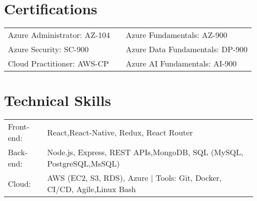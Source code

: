 \documentclass[a4paper,12pt]{article}
\begin{document}


\section{Certifications}

\begin{tabularx}{\linewidth}{@{} l X l @{}}
  
    Azure Administrator: AZ-104 & \quad & Azure Fundamentals: AZ-900 \\
    Azure Security: SC-900 & \quad & Azure Data Fundamentals: DP-900 \\
    Cloud Practitioner: AWS-CP  & \quad & Azure AI Fundamentals: AI-900 \\
\end{tabularx}



\section{Technical Skills}
\begin{tabularx}{\linewidth}{@{}l X@{}}
Front-end: & \small{React,React-Native, Redux, React Router} \\
\break
Back-end: & \small{ Node.js, Express, REST APIs,MongoDB, SQL (MySQL, PostgreSQL,MsSQL)} \\
\break
Cloud: & \small{AWS (EC2, S3, RDS), Azure} \small { $|$ Tools: Git, Docker, CI/CD, Agile,Linux Bash} \\
\end{tabularx}

\vfill
{}
\end{document}
